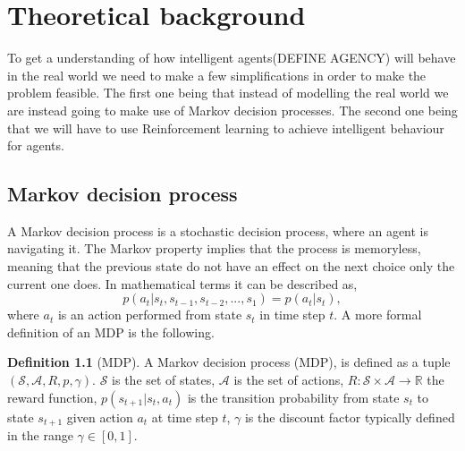 \documentclass{report}
\theoremstyle{definition}
\newtheorem{definition}{Definition}[section]
\begin{document}













\chapter{Theoretical background}
To get a understanding of how intelligent agents(DEFINE AGENCY) will behave in the real world we need to make a few simplifications in order to make the problem feasible. The first one being that instead of modelling the real world we are instead going to make use of Markov decision processes. The second one being that we will have to use Reinforcement learning to achieve intelligent behaviour for agents. 

\section{Markov decision process}
A Markov decision process is a stochastic decision process, where an agent is navigating it. The Markov property implies that the process is memoryless, meaning that the previous state do not have an effect on the next choice only the current one does. In mathematical terms it can be described as,
\[ p(a_t|s_t, s_{t-1}, s_{t-2}, ... , s_1) = p(a_t|s_t),\]
where $a_t$ is an action performed from state $s_t$ in time step $t$. A more formal definition of an MDP is the following.

\begin{definition}[MDP]
    A Markov decision process (MDP), is defined as a tuple $(\mathcal{S}, \mathcal{A}, R, p, \gamma)$. $\mathcal{S}$ is the set of states, $\mathcal{A}$ is the set of actions, $R: \mathcal{S} \times \mathcal{A} \rightarrow \mathbb{R}$ the reward function, $p(s_{t+1}|s_t, a_t)$ is the transition probability from state $s_t$ to state $s_{t+1}$ given action $a_t$ at time step $t$, $\gamma$ is the discount factor typically defined in the range $\gamma \in [0, 1]$.
\end{definition}
\end{document}
